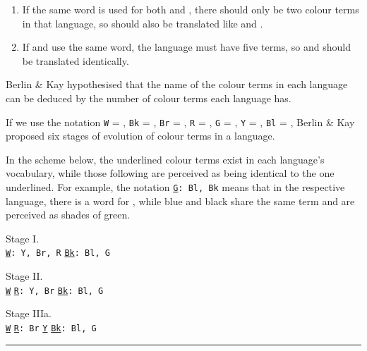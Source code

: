 \begin{refsection}
\begin{mysolution}
\begin{solutions}
\begin{enumerate}[label = \alph*., start = 4]
        \item If the same word is used for both  and , there should only be two colour terms in that language, so  should also be translated like  and .
        \item If  and  use the same word, the language must have five terms, so  and  should be translated identically.
    \end{enumerate}
    \item Berlin \& Kay hypothesised that the name of the colour terms in each language can be deduced by the number of colour terms each language has.

If we use the notation \texttt{W} = , \texttt{Bk} = , \texttt{Br} = , \texttt{R} = , \texttt{G} = , \texttt{Y} = , \texttt{Bl} = , Berlin \& Kay proposed six stages of evolution of colour terms in a language.

In the scheme below, the underlined colour terms exist in each language's vocabulary, while those following are perceived as being identical to the one underlined. For example, the notation \texttt{\uline{G}: Bl, Bk} means that in the respective language, there is a word for , while blue and black share the same term and are perceived as shades of green.\\
\end{solutions}
\end{mysolution}

\begin{framed}
    \quad Stage I. \\ 
    \texttt{\uline{W}: Y, Br, R} \hfill \texttt{\uline{Bk}: Bl, G}
\end{framed}
\begin{framed}
    \quad Stage II. \\ 
    \texttt{\uline{W}} \hfill \texttt{\uline{R}: Y, Br} \hfill \texttt{\uline{Bk}: Bl, G}
\end{framed}
\begin{framed}
    \quad Stage IIIa. \\ 
    \texttt{\uline{W}} \hfill \texttt{\uline{R}: Br} \hfill \texttt{\uline{Y}} \hfill \texttt{\uline{Bk}: Bl, G}\\
    \noindent\hspace*{-\FrameSep}\rule{\textwidth + 2 \FrameSep}{\FrameRule}
    

\end{framed}
\end{refsection}
